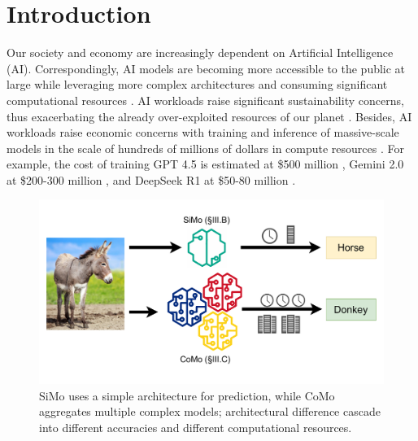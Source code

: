 \section{Introduction} \label{sec:introduction}



Our society and economy are increasingly dependent on Artificial Intelligence (AI). Correspondingly, AI models are becoming more accessible to the public at large while leveraging more complex architectures and consuming significant computational resources \cite{strubell-etal-2019-energy, strubell2020energy, yarally2023uncovering}. AI workloads raise significant sustainability concerns, thus exacerbating the already over-exploited resources of our planet \cite{buchholz_extreme_2024, schwartz2020green, dhar2020carbon}. Besides, AI workloads raise economic concerns with training and inference of massive-scale models in the scale of hundreds of millions of dollars in compute resources \cite{patterson2021carbon, schwartz2020green}. For example, the cost of training GPT 4.5 is estimated at \$500 million \cite{villalobos_how_2024}, Gemini 2.0 at \$200-300 million \cite{yogatama_economics_2025}, and DeepSeek R1 at \$50-80 million \cite{yogatama_economics_2025}.


\begin{figure}
    \centering
    \includegraphics[width=0.98\linewidth]{figures/figure1-simo-como-hi-level.pdf}
    \vspace{-0.2cm}
    \caption{SiMo uses a simple architecture for prediction, while CoMo aggregates multiple complex models; architectural difference cascade into different accuracies and different computational resources.}
    \label{fig:high-level-element}
    \vspace{-0.6cm}
\end{figure}

